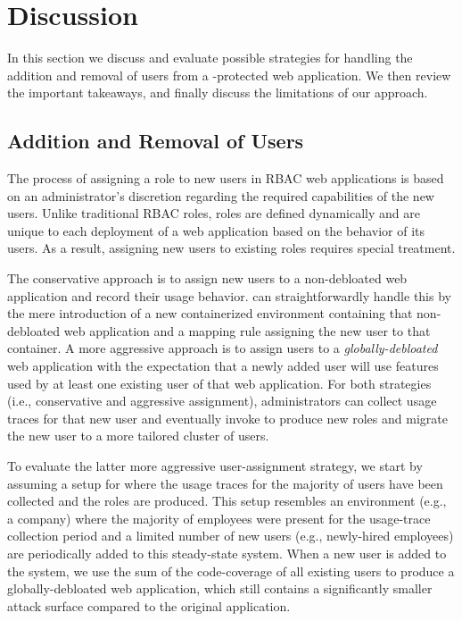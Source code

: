 \section{Discussion}

In this section we discuss and evaluate possible strategies for handling the addition and removal of users from a \dbltr{}-protected web application. We then review the important takeaways, and finally discuss the limitations of our approach.

\subsection{Addition and Removal of Users} 

The process of assigning a role to new users in RBAC web applications is based on an administrator's discretion regarding the required capabilities of the new users. 
Unlike traditional RBAC roles, \dbltr{} roles are defined dynamically and are unique to each deployment of a web application based on the behavior of its users. 
As a result, assigning new users to existing \dbltr{} roles requires special treatment. 

The conservative approach is to assign new users to a non-debloated web application and record their usage behavior. \dbltr{} can straightforwardly handle this by the mere introduction of a new containerized environment containing that non-debloated web application and a mapping rule assigning the new user to that container. A more aggressive approach is to assign users to a \emph{globally-debloated} web application with the expectation that a newly added user will use features used by at least one existing user of that web application. For both strategies (i.e., conservative and aggressive assignment), administrators can collect usage traces for that new user and eventually invoke \dbltr{} to produce new roles and migrate the new user to a more tailored cluster of users.

To evaluate the latter more aggressive user-assignment strategy, we start by assuming a setup for \dbltr{} where the usage traces for the majority of users have been collected and the roles are produced. This setup resembles an environment (e.g., a company) where the majority of employees were present for the usage-trace collection period and a limited number of new users (e.g., newly-hired employees) are periodically added to this steady-state system. When a new user is added to the system, we use the sum of the code-coverage of all existing users to produce a globally-debloated web application, which still contains a significantly smaller attack surface compared to the original application. 


